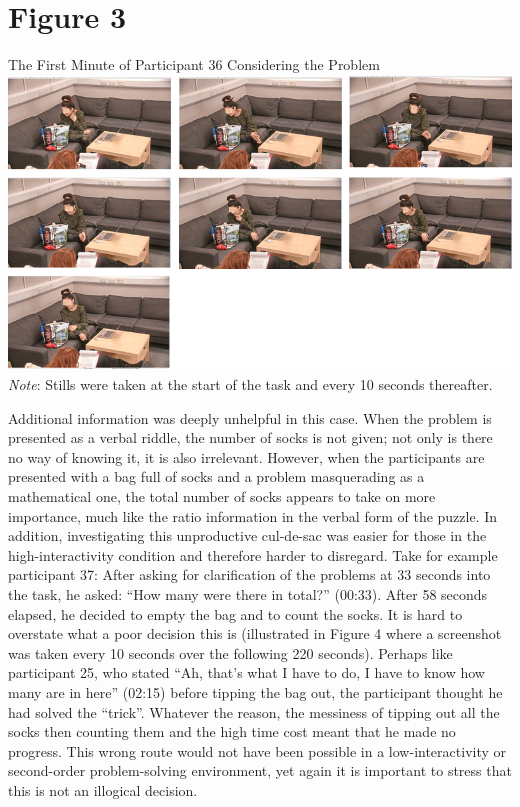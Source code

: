 \documentclass[twocolumn, serif, empirical, authordate]{jote-article}
\begin{document}
{{
\section{Figure 3}

The First Minute of Participant 36 Considering the Problem \includegraphics[width=5.28681in,height=3.08056in]{media/media/image3.png} 
\emph{Note}: Stills were taken at the start of the task and every 10 seconds thereafter.

Additional information was deeply unhelpful in this case. When the problem is presented as a verbal riddle, the number of socks is not given; not only is there no way of knowing it, it is also irrelevant.
However, when the participants are presented with a bag full of socks and a problem masquerading as a mathematical one, the total number of socks appears to take on more importance, much like the ratio information in the verbal form of the puzzle. In addition, investigating this unproductive cul-de-sac was easier for those in the high-interactivity condition and therefore harder to disregard. Take for example participant 37: After asking for clarification of the problems at 33 seconds into the task, he asked: ``How many were there in total?'' (00:33). After 58 seconds elapsed, he decided to empty the bag and to count the socks. It is hard to overstate what a poor decision this is (illustrated in Figure 4 where a screenshot was taken every 10 seconds over the following 220 seconds). Perhaps like participant 25, who stated ``Ah, that's what I have to do, I have to know how many are in here'' (02:15) before tipping the bag out, the participant thought he had solved the ``trick''. Whatever the reason, the messiness of tipping out all the socks then counting them and the high time cost meant that he made no progress. This wrong route would not have been possible in a low-interactivity or second-order problem-solving environment, yet again it is important to stress that this is not an illogical decision.

}}
\end{document}

